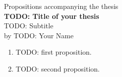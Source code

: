 \documentclass{article}
\begin{document}
	\thispagestyle{empty}
	\begin{centering}
		{\Large Propositions accompanying the thesis}\\
		\vspace{2em}
		\textbf{\LARGE TODO: Title of your thesis}\\
		\Large TODO: Subtitle\\
		\vspace{1em}
		{\large by TODO: Your Name}\\
	\end{centering}
	\vspace{2em}

	\begin{enumerate}
		\item TODO: first proposition.
		\item TODO: second proposition.
	\end{enumerate}
\end{document}
